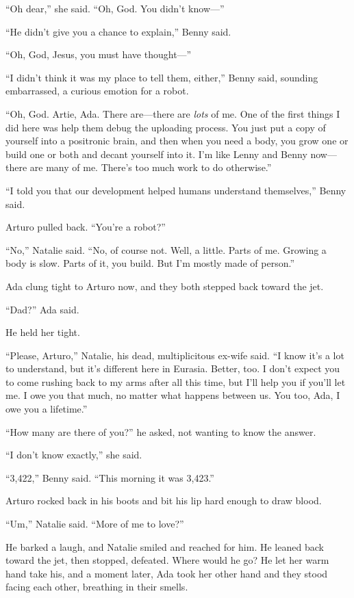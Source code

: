 “Oh dear,” she said. “Oh, God. You didn’t know—”

“He didn’t give you a chance to explain,” Benny said.

“Oh, God, Jesus, you must have thought—”

“I didn’t think it was my place to tell them, either,” Benny said,
sounding embarrassed, a curious emotion for a robot.

“Oh, God. Artie, Ada. There are—there are \emph{lots} of me. One of
the first things I did here was help them debug the uploading
process. You just put a copy of yourself into a positronic brain,
and then when you need a body, you grow one or build one or both
and decant yourself into it. I’m like Lenny and Benny now—there are
many of me. There’s too much work to do otherwise.”

“I told you that our development helped humans understand
themselves,” Benny said.

Arturo pulled back. “You’re a robot?”

“No,” Natalie said. “No, of course not. Well, a little. Parts of
me. Growing a body is slow. Parts of it, you build. But I’m mostly
made of person.”

Ada clung tight to Arturo now, and they both stepped back toward
the jet.

“Dad?” Ada said.

He held her tight.

“Please, Arturo,” Natalie, his dead, multiplicitous ex-wife said.
“I know it’s a lot to understand, but it’s different here in
Eurasia. Better, too. I don’t expect you to come rushing back to my
arms after all this time, but I’ll help you if you’ll let me. I owe
you that much, no matter what happens between us. You too, Ada, I
owe you a lifetime.”

“How many are there of you?” he asked, not wanting to know the
answer.

“I don’t know exactly,” she said.

“3,422,” Benny said. “This morning it was 3,423.”

Arturo rocked back in his boots and bit his lip hard enough to draw
blood.

“Um,” Natalie said. “More of me to love?”

He barked a laugh, and Natalie smiled and reached for him. He
leaned back toward the jet, then stopped, defeated. Where would he
go? He let her warm hand take his, and a moment later, Ada took her
other hand and they stood facing each other, breathing in their
smells.

